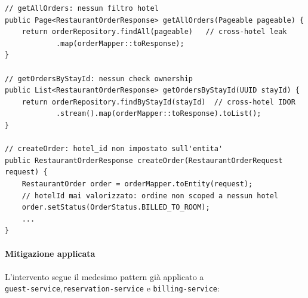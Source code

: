 ﻿\documentclass[a4paper,12pt]{report}
\begin{document}
\begin{insecurebox}[title={Codice Vulnerabile --- RestaurantOrderServiceImpl.java (baseline)}]
\begin{lstlisting}[style=java]
// getAllOrders: nessun filtro hotel
public Page<RestaurantOrderResponse> getAllOrders(Pageable pageable) {
    return orderRepository.findAll(pageable)   // cross-hotel leak
            .map(orderMapper::toResponse);
}

// getOrdersByStayId: nessun check ownership
public List<RestaurantOrderResponse> getOrdersByStayId(UUID stayId) {
    return orderRepository.findByStayId(stayId)  // cross-hotel IDOR
            .stream().map(orderMapper::toResponse).toList();
}

// createOrder: hotel_id non impostato sull'entita'
public RestaurantOrderResponse createOrder(RestaurantOrderRequest request) {
    RestaurantOrder order = orderMapper.toEntity(request);
    // hotelId mai valorizzato: ordine non scoped a nessun hotel
    order.setStatus(OrderStatus.BILLED_TO_ROOM);
    ...
}
\end{lstlisting}
\end{insecurebox}

\paragraph{Mitigazione applicata}
L'intervento segue il medesimo pattern già applicato a \\
\texttt{guest-service},\texttt{reservation-service} e \texttt{billing-service}:
\end{document}
